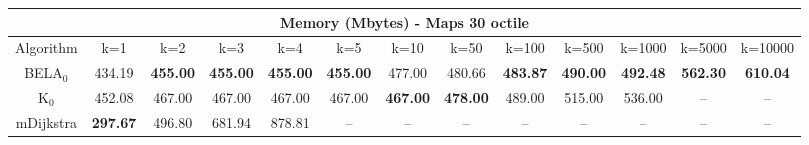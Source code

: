 \begin{tabular}{c|cccccccccccc}\toprule
\multicolumn{13}{c}{Memory (Mbytes) - Maps 30 octile}\\ \midrule
Algorithm & k=1 & k=2 & k=3 & k=4 & k=5 & k=10 & k=50 & k=100 & k=500 & k=1000 & k=5000 & k=10000 \\ \midrule
BELA$_0$ & 434.19 & \textbf{455.00} & \textbf{455.00} & \textbf{455.00} & \textbf{455.00} & 477.00 & 480.66 & \textbf{483.87} & \textbf{490.00} & \textbf{492.48} & \textbf{562.30} & \textbf{610.04} \\
K$_0$ & 452.08 & 467.00 & 467.00 & 467.00 & 467.00 & \textbf{467.00} & \textbf{478.00} & 489.00 & 515.00 & 536.00 & -- & -- \\
mDijkstra & \textbf{297.67} & 496.80 & 681.94 & 878.81 & -- & -- & -- & -- & -- & -- & -- & -- \\ \bottomrule 
\end{tabular}
